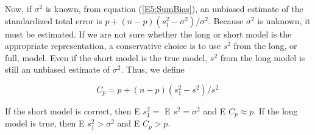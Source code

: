 Now, if $\sigma ^{2}$ is known, from equation (\ref{E5:SumBias}), an
unbiased estimate of the standardized total error is $
p+(n-p)(s_{1}^{2}-\sigma ^{2})/\sigma ^{2}.$ Because $\sigma ^{2}$
is unknown, it must be estimated. If we are not sure whether the
long or short model is the appropriate representation, a
conservative choice is to use $s^{2}$ from the long, or full, model.
Even if the short model is the true model, $s^{2}$ from the long
model is still an unbiased estimate of $\sigma ^{2}$. Thus, we
define

\begin{center}
\[
C_{p}=p+(n-p)(s_{1}^{2}-s^{2})/s^{2.}
\]
\end{center}

If the short model is correct, then E $s_{1}^{2}=$ E $s^{2}=\sigma ^{2}$ and
E $C_{p}\approx p$. If the long model is true, then E $s_{1}^{2}>\sigma ^{2}$
and E $C_{p}>p$.
